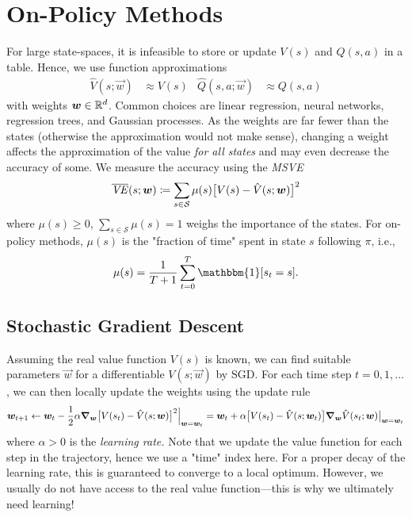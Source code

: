 	\section{On-Policy Methods} %
		For large state-spaces, it is infeasible to store or update \(V(s)\) and \(Q(s, a)\) in a table. Hence, we use function approximations
		\begin{align}
			\hat{V}(s; \vec{w}) &\approx V(s) &
			\hat{Q}(s, a; \vec{w}) &\approx Q(s, a)
		\end{align}
		with weights \(\bm{w} \in \mathbb{R}^d\). Common choices are linear regression, neural networks, regression trees, and Gaussian processes. As the weights are far fewer than the states (otherwise the approximation would not make sense), changing a weight affects the approximation of the value \emph{for all states} and may even decrease the accuracy of some. We measure the accuracy using the \emph{\ac{MSVE}}
		\begin{equation}
			\overline{\mathit{VE}}(s; \bm{w}) \coloneqq \sum_{s \in \mathcal{S}} \mu(s) \bigl[ V(s) - \hat{V}(s; \bm{w}) \bigr]^2
		\end{equation}
		where \( \mu(s) \geq 0 \), \( \sum_{s \in \mathcal{S}} \mu(s) = 1 \) weighs the importance of the states. For on-policy methods, \(\mu(s)\) is the "fraction of time" spent in state \(s\) following \(\pi\), i.e.,
		\begin{equation}
			\mu(s) = \frac{1}{T + 1} \sum_{t = 0}^{T} \mathbbm{1}[s_t = s].
		\end{equation}

		\subsection{Stochastic Gradient Descent}
			Assuming the real value function \(V(s)\) is known, we can find suitable parameters \(\vec{w}\) for a differentiable \(V(s; \vec{w})\) by \ac{SGD}. For each time step \(t = 0, 1, \dots\), we can then locally update the weights using the update rule
			\begin{equation}
				\bm{w}_{t + 1}
					\gets \bm{w}_t - \frac{1}{2} \alpha \grad_{\bm{w}} \bigl[ V(s_t) - \hat{V}(s; \bm{w}) \bigr]^2 \Bigr\rvert_{\bm{w} = \bm{w}_t}
					= \bm{w}_t + \alpha \bigl[ V(s_t) - \hat{V}(s; \bm{w}_t) \bigr] \grad_{\bm{w}} \hat{V}(s_t; \bm{w}) \bigr\rvert_{\bm{w} = \bm{w}_t}
					\label{eq:sgdFuncApprox}
			\end{equation}
			where \(\alpha > 0\) is the \emph{learning rate.} Note that we update the value function for each step in the trajectory, hence we use a "time" index here. For a proper decay of the learning rate, this is guaranteed to converge to a local optimum. However, we usually do not have access to the real value function---this is why we ultimately need learning!

